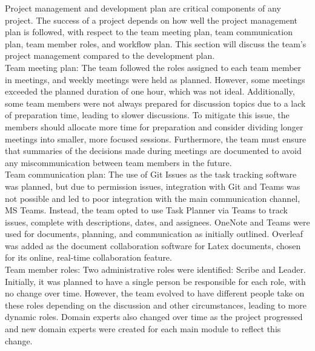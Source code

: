 \documentclass{article}
\begin{document}
\indent Project management and development plan are critical components of any project. The success of a project depends on how well the project management plan is followed, with respect to the team meeting plan, team communication plan, team member roles, and workflow plan. This section will discuss the team's project management compared to the development plan.
\\ \indent Team meeting plan: The team followed the roles assigned to each team member in meetings, and weekly meetings were held as planned. However, some meetings exceeded the planned duration of one hour, which was not ideal. Additionally, some team members were not always prepared for discussion topics due to a lack of preparation time, leading to slower discussions. To mitigate this issue, the members should allocate more time for preparation and consider dividing longer meetings into smaller, more focused sessions. Furthermore, the team must ensure that summaries of the decisions made during meetings are documented to avoid any miscommunication between team members in the future.
\\ \indent Team communication plan: The use of Git Issues as the task tracking software was planned, but due to permission issues, integration with Git and Teams was not possible and led to poor integration with the main communication channel, MS Teams. Instead, the team opted to use Task Planner via Teams to track issues, complete with descriptions, dates, and assignees. OneNote and Teams were used for documents, planning, and communication as initially outlined. Overleaf was added as the document collaboration software for Latex documents, chosen for its online, real-time collaboration feature.
\\ \indent Team member roles: Two administrative roles were identified: Scribe and Leader. Initially, it was planned to have a single person be responsible for each role, with no change over time. However, the team evolved to have different people take on these roles depending on the discussion and other circumstances, leading to more dynamic roles. Domain experts also changed over time as the project progressed and new domain experts were created for each main module to reflect this change.
\end{document}
